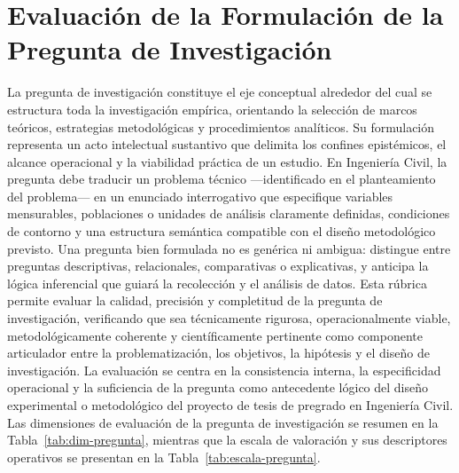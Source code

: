 \clearpage
\section{Evaluación de la Formulación de la Pregunta de Investigación}

{\footnotesize
La pregunta de investigación constituye el eje conceptual alrededor del cual se estructura toda la investigación empírica, orientando la selección de marcos teóricos, estrategias metodológicas y procedimientos analíticos. Su formulación representa un acto intelectual sustantivo que delimita los confines epistémicos, el alcance operacional y la viabilidad práctica de un estudio. En Ingeniería Civil, la pregunta debe traducir un problema técnico ---identificado en el planteamiento del problema--- en un enunciado interrogativo que especifique variables mensurables, poblaciones o unidades de análisis claramente definidas, condiciones de contorno y una estructura semántica compatible con el diseño metodológico previsto. Una pregunta bien formulada no es genérica ni ambigua: distingue entre preguntas descriptivas, relacionales, comparativas o explicativas, y anticipa la lógica inferencial que guiará la recolección y el análisis de datos. Esta rúbrica permite evaluar la calidad, precisión y completitud de la pregunta de investigación, verificando que sea técnicamente rigurosa, operacionalmente viable, metodológicamente coherente y científicamente pertinente como componente articulador entre la problematización, los objetivos, la hipótesis y el diseño de investigación. La evaluación se centra en la consistencia interna, la especificidad operacional y la suficiencia de la pregunta como antecedente lógico del diseño experimental o metodológico del proyecto de tesis de pregrado en Ingeniería Civil. Las dimensiones de evaluación de la pregunta de investigación se resumen en la Tabla~\ref{tab:dim-pregunta}, mientras que la escala de valoración y sus descriptores operativos se presentan en la Tabla~\ref{tab:escala-pregunta}.\par
}

